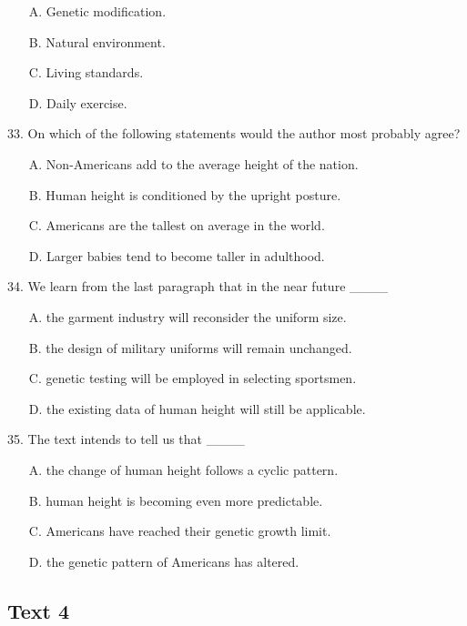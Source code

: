 \documentclass[UTF8,11pt]{ctexart}
\begin{document}
\begin{itemize}[leftmargin=2em,itemsep=.2em,topsep=.4em]\item[A.] Genetic modification.
\item[B.] Natural environment.
\item[C.] Living standards.
\item[D.] Daily exercise.
\end{itemize}

33. On which of the following statements would the author most probably agree?


\begin{itemize}[leftmargin=2em,itemsep=.2em,topsep=.4em]\item[A.] Non-Americans add to the average height of the nation.
\item[B.] Human height is conditioned by the upright posture.
\item[C.] Americans are the tallest on average in the world.
\item[D.] Larger babies tend to become taller in adulthood.
\end{itemize}

34. We learn from the last paragraph that in the near future \_\_\_\_


\begin{itemize}[leftmargin=2em,itemsep=.2em,topsep=.4em]\item[A.] the garment industry will reconsider the uniform size.
\item[B.] the design of military uniforms will remain unchanged.
\item[C.] genetic testing will be employed in selecting sportsmen.
\item[D.] the existing data of human height will still be applicable.
\end{itemize}

35. The text intends to tell us that \_\_\_\_


\begin{itemize}[leftmargin=2em,itemsep=.2em,topsep=.4em]\item[A.] the change of human height follows a cyclic pattern.
\item[B.] human height is becoming even more predictable.
\item[C.] Americans have reached their genetic growth limit.
\item[D.] the genetic pattern of Americans has altered.
\end{itemize}

\subsection*{\textbf{Text 4}}
\end{document}
